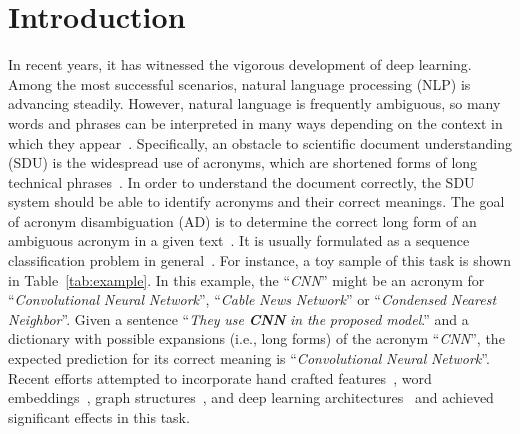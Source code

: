 \section{Introduction}
\label{sec:introduction}

\begin{table*}
    \centering
    \caption{A toy sample of acronym disambiguation.}
    \label{tab:example}
\end{table*}

In recent years, it has witnessed the vigorous development of deep learning.
Among the most successful scenarios, natural language processing (NLP) is advancing steadily.
However, natural language is frequently ambiguous, so many words and phrases can be interpreted in many ways depending on the context in which they appear~\cite{navigli2009word}.
Specifically, an obstacle to scientific document understanding (SDU) is the widespread use of acronyms, which are shortened forms of long technical phrases~\cite{veyseh-et-al-2020-what,Beltagy2019SciBERT}.
In order to understand the document correctly, the SDU system should be able to identify acronyms and their correct meanings.
The goal of acronym disambiguation (AD) is to determine the correct long form of an ambiguous acronym in a given text~\cite{veyseh2020acronym}.
It is usually formulated as a sequence classification problem in general~\cite{veyseh-et-al-2020-what}.
For instance, a toy sample of this task is shown in Table~\ref{tab:example}.
In this example, 
the ``\textit{CNN}'' might be an acronym for ``\textit{Convolutional} \textit{Neural} \textit{Network}'', ``\textit{Cable} \textit{News} \textit{Network}'' or ``\textit{Condensed} \textit{Nearest} \textit{Neighbor}''.
Given a sentence ``\textit{They} \textit{use} \textit{\textbf{CNN}} \textit{in} \textit{the} \textit{proposed} \textit{model}.'' and a dictionary with possible expansions (i.e., long forms) of the acronym ``\textit{CNN}'', the expected prediction for its correct meaning is ``\textit{Convolutional} \textit{Neural} \textit{Network}''.
Recent efforts attempted to incorporate hand crafted features~\cite{li2018guess}, word embeddings~\cite{charbonnier2018using,ciosici2019unsupervised}, graph structures~\cite{prokofyev2013ontology,veyseh-et-al-2020-what}, and deep learning architectures~\cite{jin2019deep,blevins2020moving} and achieved significant effects in this task.


